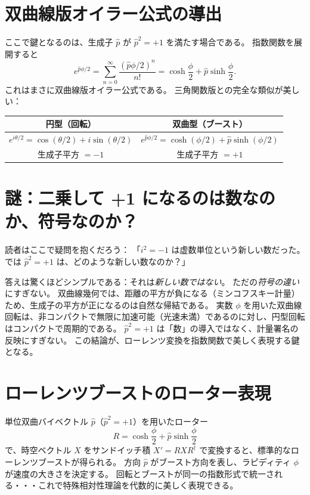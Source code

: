 \documentclass[dvipdfmx,a4paper]{jsbook}
\theoremstyle{definition}
\theoremstyle{remark}
\begin{document}
\section{双曲線版オイラー公式の導出}
\label{sec:hyperbolic-euler-derivation}

ここで鍵となるのは、生成子 $\hat{p}$ が $\hat{p}^2 = +1$ を満たす場合である。
指数関数を展開すると
\begin{equation}
  e^{\hat{p}\phi/2} = \sum_{n=0}^\infty \frac{(\hat{p}\phi/2)^n}{n!} = \cosh\frac{\phi}{2} + \hat{p} \sinh\frac{\phi}{2}.
\end{equation}
これはまさに双曲線版オイラー公式である。
三角関数版との完全な類似が美しい：
\begin{center}
  \begin{tabular}{c|c}
    円型（回転） & 双曲型（ブースト） \\ \hline
    $e^{i\theta/2} = \cos(\theta/2) + i \sin(\theta/2)$ & $e^{\hat{p}\phi/2} = \cosh(\phi/2) + \hat{p} \sinh(\phi/2)$ \\
    生成子平方 $= -1$ & 生成子平方 $= +1$
  \end{tabular}
\end{center}

\section{謎：二乗して +1 になるのは数なのか、符号なのか？}
\label{sec:square-plus-one}

読者はここで疑問を抱くだろう：
「$i^2 = -1$ は虚数単位という新しい数だった。
では $\hat{p}^2 = +1$ は、どのような新しい数なのか？」

答えは驚くほどシンプルである：それは\emph{新しい数ではない}。
ただの\emph{符号の違い}にすぎない。
双曲線幾何では、距離の平方が負になる（ミンコフスキー計量）ため、生成子の平方が正になるのは自然な帰結である。
実数 $\phi$ を用いた双曲線回転は、非コンパクトで無限に加速可能（光速未満）であるのに対し、円型回転はコンパクトで周期的である。
$\hat{p}^2 = +1$ は「数」の導入ではなく、計量署名の反映にすぎない。
この結論が、ローレンツ変換を指数関数で美しく表現する鍵となる。

\section{ローレンツブーストのローター表現}
\label{sec:lorentz-boost-rotor}

単位双曲バイベクトル $\hat{p}$（$\hat{p}^2 = +1$）を用いたローター
\begin{equation}
  R = \cosh\frac{\phi}{2} + \hat{p} \sinh\frac{\phi}{2}
\end{equation}
で、時空ベクトル $X$ をサンドイッチ積 $X' = R X R^\dagger$ で変換すると、標準的なローレンツブーストが得られる。
方向 $\hat{p}$ がブースト方向を表し、ラピディティ $\phi$ が速度の大きさを決定する。
回転とブーストが同一の指数形式で統一される・・・これで特殊相対性理論を代数的に美しく表現できる。
\end{document}
